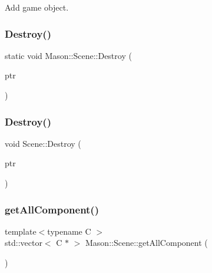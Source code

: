 Add game object. 

\hypertarget{class_mason_1_1_scene_a4721fcf8438883759478aee25bf247c2}{}\label{class_mason_1_1_scene_a4721fcf8438883759478aee25bf247c2} 
\subsubsection{\texorpdfstring{Destroy()}{Destroy()}\hspace{0.1cm}{\footnotesize\ttfamily [1/2]}}
{\footnotesize\ttfamily static void Mason\+::\+Scene\+::\+Destroy (\begin{DoxyParamCaption}\item[{std\+::shared\+\_\+ptr$<$ \hyperlink{class_mason_1_1_game_object}{Game\+Object} $>$}]{ptr }\end{DoxyParamCaption})\hspace{0.3cm}{\ttfamily [static]}}

\hypertarget{class_mason_1_1_scene_a8f395f22c024c0d5161cfa8e024f177d}{}\label{class_mason_1_1_scene_a8f395f22c024c0d5161cfa8e024f177d} 
\subsubsection{\texorpdfstring{Destroy()}{Destroy()}\hspace{0.1cm}{\footnotesize\ttfamily [2/2]}}
{\footnotesize\ttfamily void Scene\+::\+Destroy (\begin{DoxyParamCaption}\item[{\hyperlink{class_mason_1_1_game_object}{Game\+Object} $\ast$}]{ptr }\end{DoxyParamCaption})\hspace{0.3cm}{\ttfamily [static]}}

\hypertarget{class_mason_1_1_scene_a889caa86c1c4c8fad9416c7240148232}{}\label{class_mason_1_1_scene_a889caa86c1c4c8fad9416c7240148232} 
\subsubsection{\texorpdfstring{get\+All\+Component()}{getAllComponent()}}
{\footnotesize\ttfamily template$<$typename C $>$ \\
std\+::vector$<$ C $\ast$ $>$ Mason\+::\+Scene\+::get\+All\+Component (\begin{DoxyParamCaption}{ }\end{DoxyParamCaption})}




